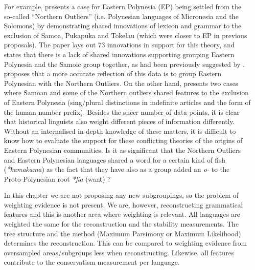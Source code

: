 \documentclass[draft,10pt]{article} %
\begin{document}
For example, \citet{wilson_whence} presents a case for Eastern Polynesia (EP) being settled from the so-called ``Northern Outliers'' (i.e. Polynesian languages of Micronesia and the Solomons) by demonstrating shared innovations of lexicon and grammar to the exclusion of Samoa, Pukapuka and Tokelau (which were closer to EP in previous proposals). The paper lays out 73 innovations in support for this theory, and states that there is a lack of shared innovations supporting grouping Eastern Polynesia and the Samoic group together, as had been previously suggested by \citet{pawley1966polynesian}. \citet{wilson_whence} proposes that a more accurate reflection of this data is to group Eastern Polynesian with the Northern Outliers. On the other hand, \citet[53, 61]{pawley1966polynesian} presents two cases where Samoan and some of the Northern outliers shared features to the exclusion of Eastern Polynesia (sing/plural distinctions in indefinite articles and the form of the human number prefix). Besides the sheer number of data-points, it is clear that historical linguists also weight different pieces of information differently. Without an internalised in-depth knowledge of these matters, it is difficult to know how to evaluate the support for these conflicting theories of the origins of Eastern Polynesian communities. Is it as significant that the Northern Outliers and Eastern Polynesian languages shared a word for a certain kind of fish (\emph{*kamakama}) as the fact that they have also as a group added an \emph{o-} to the Proto-Polynesian root \emph{*fia} (want) \citep{wilson_whence}? 

In this chapter we are not proposing any new subgroupings, so the problem of weighting evidence is not present. We are, however, reconstructing grammatical features and this is another area where weighting is relevant. All languages are weighted the same for the reconstruction and the stability measurements. The tree structure and the method (Maximum Parsimony or Maximum Likelihood) determines the reconstruction. This can be compared to weighting evidence from oversampled areas/subgroups less when reconstructing. Likewise, all features contribute to the conservatism measurement per language.


\end{document}
